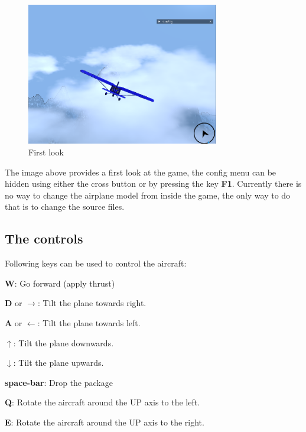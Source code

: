 \begin{figure}[H]
    \centering
    \includegraphics[width=0.75\textwidth]{images/game1.png}
    \caption{First look}
    \label{fig:first-look}
\end{figure}


The image above provides a first look at the game, the config menu can be hidden using either the cross button or by pressing the key \textbf{F1}. Currently there is no way to change the airplane model from inside the game, the only way to do that is to change the source files.

\bigskip

\subsection{The controls}

Following keys can be used to control the aircraft:
\begin{compactdesc}
  \item[\textbf{W}:] Go forward (apply thrust)
  \item[\textbf{D} or $\rightarrow$:] Tilt the plane towards right.
  \item[\textbf{A} or $\leftarrow$:] Tilt the plane towards left.
  \item[$\uparrow$:] Tilt the plane downwards.
  \item[$\downarrow$:] Tilt the plane upwards.
  \item[\textbf{space-bar}:] Drop the package
  \item[\textbf{Q}:] Rotate the aircraft around the UP axis to the left.
  \item[\textbf{E}:] Rotate the aircraft around the UP axis to the right.
\end{compactdesc}


